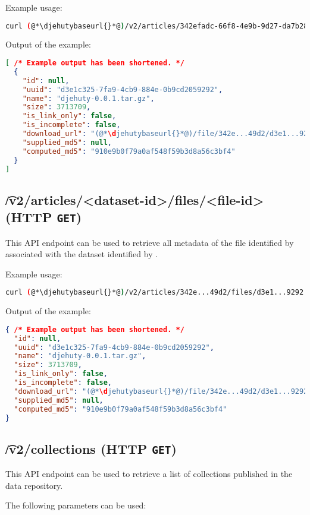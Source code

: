   Example usage:
\begin{lstlisting}[language=bash]
curl (@*\djehutybaseurl{}*@)/v2/articles/342efadc-66f8-4e9b-9d27-da7b28b849d2/files
\end{lstlisting}

  Output of the example:
\begin{lstlisting}[language=JSON]
[ /* Example output has been shortened. */
  {
    "id": null,
    "uuid": "d3e1c325-7fa9-4cb9-884e-0b9cd2059292",
    "name": "djehuty-0.0.1.tar.gz",
    "size": 3713709,
    "is_link_only": false,
    "is_incomplete": false,
    "download_url": "(@*\djehutybaseurl{}*@)/file/342e...49d2/d3e1...9292",
    "supplied_md5": null,
    "computed_md5": "910e9b0f79a0af548f59b3d8a56c3bf4"
  }
]
\end{lstlisting}

\subsection{\t{/v2/articles/<dataset-id>/files/<file-id>} (HTTP \texttt{GET})}

  This API endpoint can be used to retrieve all metadata of the file
  identified by  associated with the dataset identified
  by .

  Example usage:
\begin{lstlisting}[language=bash]
curl (@*\djehutybaseurl{}*@)/v2/articles/342e...49d2/files/d3e1...9292 | jq
\end{lstlisting}

  Output of the example:
\begin{lstlisting}[language=JSON]
{ /* Example output has been shortened. */
  "id": null,
  "uuid": "d3e1c325-7fa9-4cb9-884e-0b9cd2059292",
  "name": "djehuty-0.0.1.tar.gz",
  "size": 3713709,
  "is_link_only": false,
  "is_incomplete": false,
  "download_url": "(@*\djehutybaseurl{}*@)/file/342e...49d2/d3e1...9292",
  "supplied_md5": null,
  "computed_md5": "910e9b0f79a0af548f59b3d8a56c3bf4"
}
\end{lstlisting}

\subsection{\t{/v2/collections} (HTTP \texttt{GET})}
\label{sec:v2-collections}

  This API endpoint can be used to retrieve a list of collections published
  in the data repository.

  The following parameters can be used:

